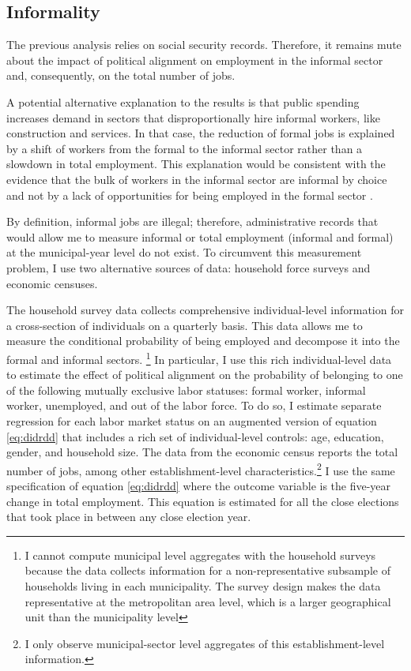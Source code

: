 \documentclass[dv_diss_main.tex]{subfiles}
\begin{document}
\subsection{Informality}
The previous analysis relies on social security records. Therefore, it remains mute about the impact of political alignment on employment in the informal sector and, consequently, on the total number of jobs.

A potential alternative explanation to the results is that public spending increases demand in sectors that disproportionally hire informal workers, like construction and services. In that case, the reduction of formal jobs is explained by a shift of workers from the formal to the informal sector rather than a slowdown in total employment. This explanation would be consistent with the evidence that the bulk of workers in the informal sector are informal by choice and not by a lack of opportunities for being employed in the formal sector \citep{alcaraz2015informality,maloney1999does}.

By definition, informal jobs are illegal; therefore, administrative records that would allow me to measure informal or total employment (informal and formal) at the municipal-year level do not exist. To circumvent this measurement problem, I use two alternative sources of data: household force surveys and economic censuses. 

The household survey data collects comprehensive individual-level information for a cross-section of individuals on a quarterly basis. This data allows me to measure the conditional probability of being employed and decompose it into the formal and informal sectors. 
\footnote{ I cannot compute municipal level aggregates with the household surveys because the data collects information for a non-representative subsample of households living in each municipality. The survey design makes the data representative at the metropolitan area level, which is a larger geographical unit than the municipality level }
In particular, I use this rich individual-level data to estimate the effect of political alignment on the probability of belonging to one of the following mutually exclusive labor statuses: formal worker, informal worker, unemployed, and out of the labor force. To do so, I estimate separate regression for each labor market status on an augmented version of equation \eqref{eq:didrdd} that includes a rich set of individual-level controls: age, education, gender, and household size. The data from the economic census reports the total number of jobs, among other establishment-level characteristics.\footnote{I only observe municipal-sector level aggregates of this establishment-level information.} I use the same specification of equation \eqref{eq:didrdd} where the outcome variable is the five-year change in total employment. This equation is estimated for all the close elections that took place in between any close election year. 
\end{document}
